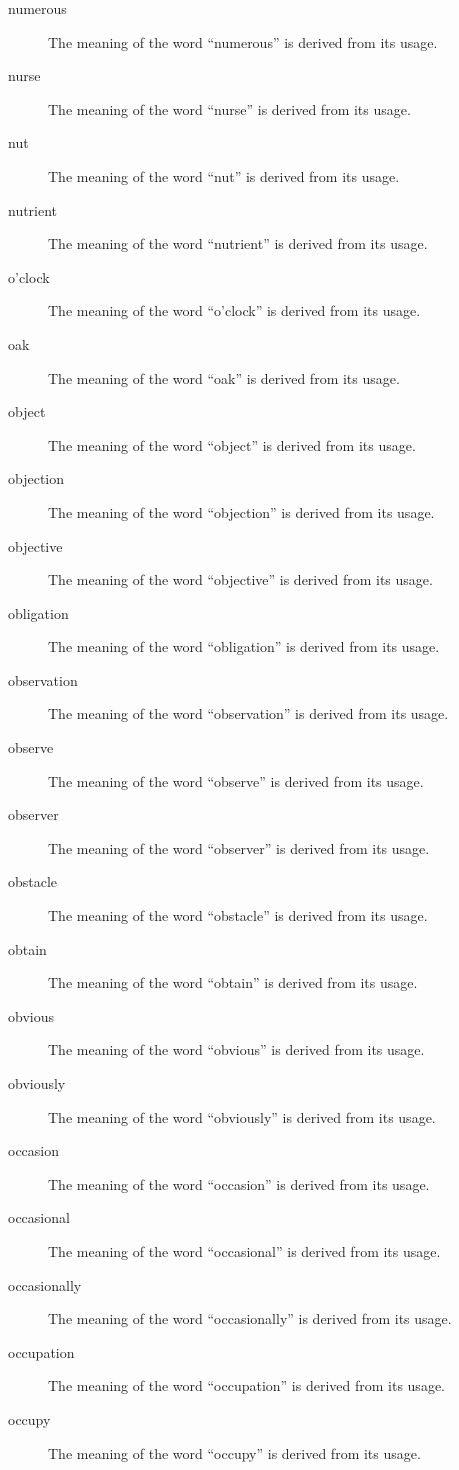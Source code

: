 \documentclass[12pt, letterpaper]{memoir}
\begin{document}
\begin{description}
\item[numerous] The meaning of the word ``numerous'' is derived from its usage.
\item[nurse] The meaning of the word ``nurse'' is derived from its usage.
\item[nut] The meaning of the word ``nut'' is derived from its usage.
\item[nutrient] The meaning of the word ``nutrient'' is derived from its usage.
\item[o'clock] The meaning of the word ``o'clock'' is derived from its usage.
\item[oak] The meaning of the word ``oak'' is derived from its usage.
\item[object] The meaning of the word ``object'' is derived from its usage.
\item[objection] The meaning of the word ``objection'' is derived from its usage.
\item[objective] The meaning of the word ``objective'' is derived from its usage.
\item[obligation] The meaning of the word ``obligation'' is derived from its usage.
\item[observation] The meaning of the word ``observation'' is derived from its usage.
\item[observe] The meaning of the word ``observe'' is derived from its usage.
\item[observer] The meaning of the word ``observer'' is derived from its usage.
\item[obstacle] The meaning of the word ``obstacle'' is derived from its usage.
\item[obtain] The meaning of the word ``obtain'' is derived from its usage.
\item[obvious] The meaning of the word ``obvious'' is derived from its usage.
\item[obviously] The meaning of the word ``obviously'' is derived from its usage.
\item[occasion] The meaning of the word ``occasion'' is derived from its usage.
\item[occasional] The meaning of the word ``occasional'' is derived from its usage.
\item[occasionally] The meaning of the word ``occasionally'' is derived from its usage.
\item[occupation] The meaning of the word ``occupation'' is derived from its usage.
\item[occupy] The meaning of the word ``occupy'' is derived from its usage.

\end{description}
\end{document}
